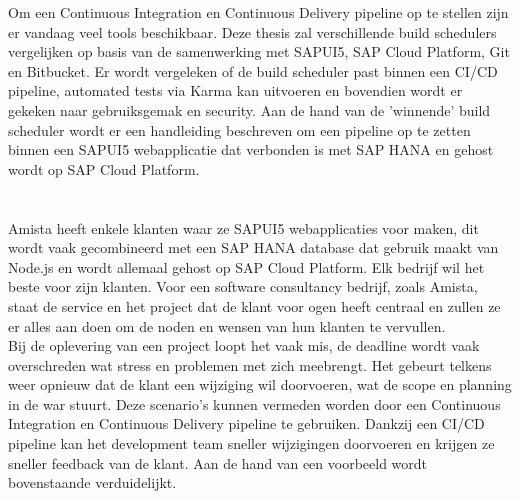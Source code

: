 Om een Continuous Integration en Continuous Delivery pipeline op te stellen zijn er vandaag veel tools beschikbaar.
Deze thesis zal verschillende build schedulers vergelijken op basis van de samenwerking met SAPUI5, SAP Cloud Platform, Git en Bitbucket. Er wordt vergeleken of de build scheduler past binnen een CI/CD pipeline, automated tests via Karma kan uitvoeren en bovendien wordt er gekeken naar gebruiksgemak en security.
Aan de hand van de 'winnende' build scheduler wordt er een handleiding beschreven om een pipeline op te zetten binnen een SAPUI5 webapplicatie dat verbonden is met SAP HANA en gehost wordt op SAP Cloud Platform.

%

\section{}
\label{sec:probleemstelling}
Amista heeft enkele klanten waar ze SAPUI5 webapplicaties voor maken, dit wordt vaak gecombineerd met een SAP HANA database dat gebruik maakt van Node.js en wordt allemaal gehost op SAP Cloud Platform.
Elk bedrijf wil het beste voor zijn klanten. Voor een software consultancy bedrijf, zoals Amista, staat de service en het project dat de klant voor ogen heeft centraal en zullen ze er alles aan doen om de noden en wensen van hun klanten te vervullen.\\
Bij de oplevering van een project loopt het vaak mis, de deadline wordt vaak overschreden wat stress en problemen met zich meebrengt. Het gebeurt telkens weer opnieuw dat de klant een wijziging wil doorvoeren, wat de scope en planning in de war stuurt. Deze scenario's kunnen vermeden worden door een Continuous Integration en Continuous Delivery pipeline te gebruiken. Dankzij een CI/CD pipeline kan het development team sneller wijzigingen doorvoeren en krijgen ze sneller feedback van de klant. Aan de hand van een voorbeeld wordt bovenstaande verduidelijkt.

